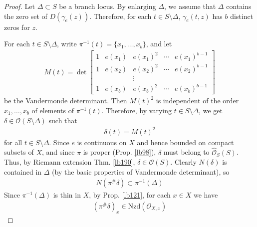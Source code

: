 \documentclass[12pt,b5paper,notitlepage]{report}
\theoremstyle{definition}
\theoremstyle{plain}
\newcommand{\scr}{\mathscr}
\newcommand{\Nzd}{\mathrm{Nzd}}
\newcommand{\Owht}{\widehat{\scr O}}
\numberwithin{equation}{section}
\begin{document}
\begin{proof}
Let $\Delta\subset S$ be a branch locus. By enlarging $\Delta$, we assume that $\Delta$ contains the zero set of $D(\gamma_e(z))$. Therefore, for each $t\in S\setminus\Delta$, $\gamma_e(t,z)$ has $b$ distinct zeros for $z$.  

For each $t\in S\setminus\Delta$, write $\pi^{-1}(t)=\{x_1,\dots,x_b\}$, and let
\begin{align}\label{eq92}
M(t)=\det \left[
\begin{array}{ccccc}
1&e(x_1)&e(x_1)^2&\cdots&e(x_1)^{b-1}\\
1&e(x_2)&e(x_2)^2&\cdots&e(x_2)^{b-1}\\
&&\vdots&&\\
1&e(x_b)&e(x_b)^2&\cdots&e(x_b)^{b-1}
\end{array}
\right]
\end{align}
be the Vandermonde determinant. Then $M(t)^2$ is independent of the order $x_1,\dots,x_b$ of elements of $\pi^{-1}(t)$. Therefore, by varying $t\in S\setminus\Delta$, we get $\delta\in\scr O(S\setminus\Delta)$ such that
\begin{align*}
\delta(t)=M(t)^2
\end{align*}
for all $t\in S\setminus\Delta$. Since $e$ is continuous on $X$ and hence bounded on compact subsets of $X$, and since $\pi$ is proper (Prop. \ref{lb98}), $\delta$ must belong to $\Owht_S(S)$. Thus, by Riemann extension Thm. \ref{lb190}, $\delta\in\scr O(S)$. Clearly $N(\delta)$ is contained in $\Delta$ (by the basic properties of Vandermonde determinant), so
\begin{align}
N(\pi^\#\delta)\subset\pi^{-1}(\Delta)  \label{eq189}
\end{align}
Since $\pi^{-1}(\Delta)$ is thin in $X$, by Prop. \ref{lb121}, for each $x\in X$ we have
\begin{align}
(\pi^\#\delta)_x\in\Nzd(\scr O_{X,x})   \label{eq188}
\end{align}


\end{proof}
\end{document}
